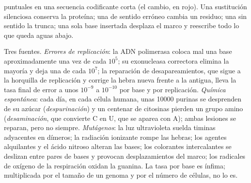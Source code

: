 \begin{omfigure}

{\small {} puntuales en una secuencia codificante corta (el
cambio, en rojo). Una sustitución silenciosa conserva la proteína; una de
sentido erróneo cambia un residuo; una sin sentido la trunca; una sola
base insertada desplaza el marco y reescribe todo lo que queda aguas
abajo.}
\end{omfigure}

\begin{proposition}\label{prop:b2:genome-diversification:sources}
Tres fuentes. \emph{Errores de replicación}: la ADN polimerasa coloca mal
una base aproximadamente una vez de cada $10^{5}$; su exonucleasa
correctora elimina la mayoría y deja una de cada $10^{7}$; la reparación
de desapareamientos, que sigue a la horquilla de replicación y corrige la
hebra nueva frente a la antigua, lleva la tasa final de error a unos
$10^{-9}$ a $10^{-10}$ por base y por
replicación. \emph{Química espontánea}: cada día, en cada célula humana,
unas \num{10000} purinas se desprenden de su azúcar
(\emph{despurinación}) y un centenar de citosinas pierden un grupo amino
(\emph{desaminación}, que convierte C en U, que se aparea con A); ambas
lesiones se reparan, pero no siempre. \emph{Mutágenos}: la luz
ultravioleta suelda timinas adyacentes en dímeros; la radiación ionizante
rompe las hebras; los agentes alquilantes y el ácido nitroso alteran las
bases; los colorantes intercalantes se deslizan entre pares de bases y
provocan desplazamientos del marco; los radicales de oxígeno de la
respiración oxidan la guanina. La tasa por base es ínfima; multiplicada
por el tamaño de un genoma y por el número de células, no lo es.
\end{proposition}

